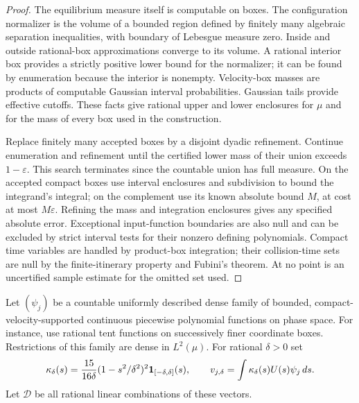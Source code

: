 \begin{proof}
The equilibrium measure itself is computable on boxes. The configuration
normalizer is the volume of a bounded region defined by finitely many
algebraic separation inequalities, with boundary of Lebesgue measure
zero. Inside and outside rational-box approximations converge to its
volume. A rational interior box provides a strictly positive lower
bound for the normalizer; it can be found by enumeration because the
interior is nonempty. Velocity-box masses are products of computable
Gaussian interval probabilities. Gaussian tails provide effective
cutoffs. These facts give rational upper and lower enclosures for
$\mu$ and for the mass of every box used in the construction.

Replace finitely many accepted boxes by a disjoint dyadic refinement.
Continue enumeration and refinement until the certified lower mass of
their union exceeds $1-\varepsilon$. This search terminates since the
countable union has full measure. On the accepted compact boxes use
interval enclosures and subdivision to bound the integrand's integral;
on the complement use its known absolute bound $M$, at cost at most
$M\varepsilon$. Refining the mass and integration enclosures gives any
specified absolute error. Exceptional input-function boundaries are
also null and can be excluded by strict interval tests for their
nonzero defining polynomials. Compact time variables are handled by
product-box integration; their collision-time sets are null by the finite-itinerary property
and Fubini's theorem.
At no point is an uncertified sample estimate for the omitted set used.
\end{proof}

Let $(\psi_j)$ be a countable uniformly described dense family of
bounded, compact-velocity-supported continuous piecewise
polynomial functions on phase space. For instance, use
rational tent functions on successively finer coordinate boxes.
Restrictions of this family are dense in $L^2(\mu)$. For rational
$\delta>0$ set
\[
 \kappa_\delta(s)=\frac{15}{16\delta}
          (1-s^2/\delta^2)^2\mathbf 1_{[-\delta,\delta]}(s),\qquad
 v_{j,\delta}=\int\kappa_\delta(s)U(s)\psi_j\,ds.
\]
Let $\mathscr D$ be all rational linear combinations of these vectors.


